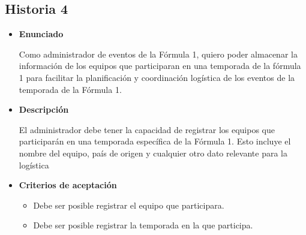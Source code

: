 \documentclass{article}
\begin{document}
	\subsection{Historia 4}
	\begin{itemize}
		
		\item \large{\textbf{Enunciado}}
		\begin{description}
			Como administrador de eventos de la Fórmula 1, quiero poder almacenar la información de los equipos que participaran en una temporada de la fórmula 1 para facilitar la planificación y coordinación logística de los eventos de la temporada de la Fórmula 1.
			
		\end{description}
		
		\item \large{\textbf{Descripción}}
		\begin{description}
			El administrador debe tener la capacidad de registrar los equipos que participarán en una temporada específica de la Fórmula 1. Esto incluye el nombre del equipo, país de origen y cualquier otro dato relevante para la logística
			
		\end{description}
		
		\item \large{\textbf{Criterios de aceptación}}
		\begin{itemize}
			\item Debe ser posible registrar el equipo que participara.
			\item Debe ser posible registrar la temporada en la que participa.
			
		\end{itemize}
		
	\end{itemize}
	
\end{document}
